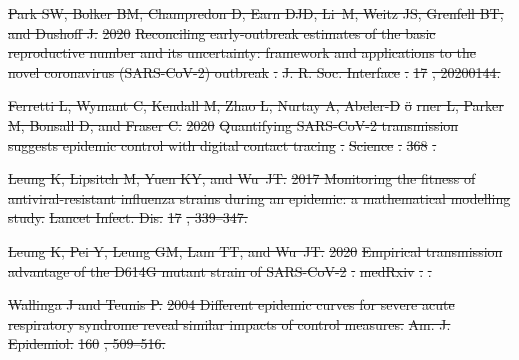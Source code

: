 \documentclass[12pt]{article}
\providecommand{\DIFdeltex}[1]{{\protect\color{red}\sout{#1}}}                      %
\providecommand{\DIFdel}[1]{\texorpdfstring{\DIFdeltex{#1}}{}} %
\begin{document}
\DIFdel{Park SW, Bolker BM, Champredon D, Earn DJD, Li~M, Weitz JS, Grenfell BT, and
  Dushoff J.
}%
\DIFdel{2020 }%
\DIFdel{Reconciling early-outbreak estimates of the basic reproductive
  number and its uncertainty: framework and applications to the novel
  coronavirus (SARS-CoV-2) outbreak}%
\DIFdel{.
}%
\DIFdel{J. R. Soc. Interface}%
\DIFdel{.
}%
\DIFdel{17}%
\DIFdel{, 20200144.
}%

\DIFdel{Ferretti L, Wymant C, Kendall M, Zhao L, Nurtay A, Abeler-D}%
\DIFdel{\"o}%
\DIFdel{rner L, Parker
  M, Bonsall D, and Fraser C.
}%
\DIFdel{2020 }%
\DIFdel{Quantifying SARS-CoV-2 transmission suggests epidemic control
  with digital contact tracing}%
\DIFdel{.
}%
\DIFdel{Science}%
\DIFdel{.
}%
\DIFdel{368}%
\DIFdel{.
}%

\DIFdel{Leung K, Lipsitch M, Yuen KY, and Wu~JT.
}%
\DIFdel{2017 Monitoring the fitness of antiviral-resistant influenza strains
  during an epidemic: a mathematical modelling study.
}%
\DIFdel{Lancet Infect. Dis.}%
\DIFdel{17}%
\DIFdel{, 339--347.
}%

\DIFdel{Leung K, Pei Y, Leung GM, Lam TT, and Wu~JT.
}%
\DIFdel{2020 }%
\DIFdel{Empirical transmission advantage of the D614G mutant strain of
  SARS-CoV-2}%
\DIFdel{.
}%
\DIFdel{medRxiv}%
\DIFdel{.
}%
\DIFdel{.
}%

\DIFdel{Wallinga J and Teunis P.
}%
\DIFdel{2004 Different epidemic curves for severe acute respiratory syndrome
  reveal similar impacts of control measures.
}%
\DIFdel{Am. J. Epidemiol.}%
\DIFdel{160}%
\DIFdel{, 509--516.
}%
\end{document}
